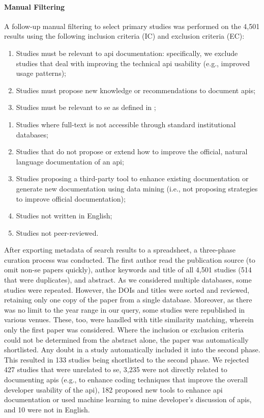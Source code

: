 \paragraph{Manual Filtering}

A follow-up manual filtering to select primary studies was performed on the 4,501 results using the following inclusion criteria (IC) and exclusion criteria (EC):

\begin{enumerate}[leftmargin=4\parindent,label=\textbf{IC\arabic*}]
  \item Studies must be relevant to \gls{api} documentation: specifically, we exclude studies that deal with improving the technical \gls{api} usability (e.g., improved usage patterns);
  \item Studies must propose new knowledge or recommendations to document \glspl{api};
  \item Studies must be relevant to \gls{se} as defined in ;
\end{enumerate}
\begin{enumerate}[leftmargin=4\parindent,label=\textbf{EC\arabic*}]
  \item Studies where full-text is not accessible through standard institutional databases; 
  \item Studies that do not propose or extend how to improve the official, natural language documentation of an \gls{api};
  \item Studies proposing a third-party tool to enhance existing documentation or generate new documentation using data mining (i.e., not proposing strategies to improve official documentation);
  \item Studies not written in English;
  \item Studies not peer-reviewed.
\end{enumerate}
\smallskip

After exporting metadata of search results to a spreadsheet, a three-phase curation process was conducted. The first author read the publication source (to omit non-\gls{se} papers quickly), author keywords and title of all 4,501 studies (514 that were duplicates), and abstract. As we considered multiple databases, some studies were repeated. However, the DOIs and titles were sorted and reviewed, retaining only one copy of the paper from a single database. Moreover, as there was no limit to the year range in our query, some studies were republished in various venues. These, too, were handled with title similarity matching, wherein only the first paper was considered. Where the inclusion or exclusion criteria could not be determined from the abstract alone, the paper was automatically shortlisted. Any doubt in a study automatically included it into the second phase. This resulted in 133 studies being shortlisted to the second phase. We rejected 427 studies that were unrelated to \gls{se}, 3,235 were not directly related to documenting \glspl{api} (e.g., to enhance coding techniques that improve the overall developer usability of the \gls{api}), 182 proposed new tools to enhance \gls{api} documentation or used machine learning to mine developer's discussion of \glspl{api}, and 10 were not in English.

